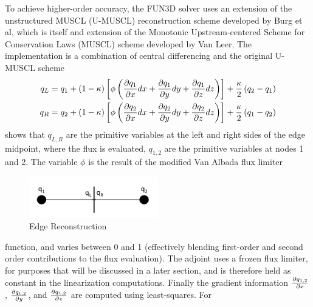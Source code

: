 To achieve higher-order accuracy, the FUN3D solver uses an extension of the
unstructured MUSCL (U-MUSCL) reconstruction scheme developed by Burg et
al\cite{burg2005higher,burg2003verification}, which is itself and extension of
the Monotonic Upstream-centered Scheme for Conservation Laws (MUSCL) scheme
developed by Van Leer\cite{van1979towards}.  The implementation is a combination
of central differencing and the original U-MUSCL scheme
\begin{equation}
  \begin{aligned}
    q_L &= q_1 + (1-\kappa)\left[ \phi\left( \frac{\partial q_1}{\partial x}dx + \frac{\partial q_1}{\partial y}dy +
    \frac{\partial q_1}{\partial z}dz \right) \right] + \frac{\kappa}{2}\left( q_2 - q_1 \right) \\
    q_R &= q_2 + (1-\kappa)\left[ \phi\left( \frac{\partial q_2}{\partial x}dx + \frac{\partial q_2}{\partial y}dy +
    \frac{\partial q_2}{\partial z}dz \right) \right] + \frac{\kappa}{2}\left( q_1 - q_2 \right)
  \end{aligned}
  \label{u-muscl}
\end{equation}
 shows that $q_{L,R}$ are the primitive variables at the
left and right sides of the edge midpoint, where the flux is evaluated,
$q_{1,2}$ are the primitive variables at nodes 1 and 2.  The variable $\phi$ is
the result of the modified Van Albada flux limiter
\begin{figure}[h]
  \centering
  \includegraphics[width=0.5\textwidth]{figures/edge_reconstruction.png}
  \caption{Edge Reconstruction}
  \label{fig:edge-recons}
\end{figure}
function\cite{van1997comparative}, and varies between 0 and 1 (effectively
blending first-order and second order contributions to the flux evaluation).
The adjoint uses a frozen flux limiter, for purposes that will be discussed in a
later section, and is therefore held as constant in the linearization
computations.  Finally the gradient information $\frac{\partial q_{1,2}}{\partial x}$,
$\frac{\partial q_{1,2}}{\partial y}$, and $\frac{\partial q_{1,2}}{\partial z}$ are computed using least-squares.  For
